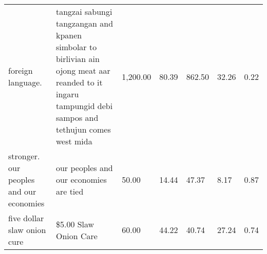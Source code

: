 \begin{table*}[ht!]
\begin{tabular}{p{5cm}p{5cm}p{1cm}p{1cm}p{1cm}p{1cm}p{1cm}}
foreign language.                                                                                                                                                                                                                                                                                  & tangzai sabungi tangzangan and kpanen simbolar to birlivian ain ojong meat aar reanded to it ingaru tampungid debi sampos and tethujun comes west mida                                                                                                                                               & 1,200.00 & 80.39 & 862.50 & 32.26 & 0.22       \\
stronger. our peoples and our economies                                                                                                                                                                                                                                                            & our peoples and our economies are tied                                                                                                                                                                                                                                                               & 50.00    & 14.44 & 47.37  & 8.17  & 0.87       \\
five dollar slaw onion cure                                                                                                                                                                                                                                                                        & \$5.00 Slaw Onion Care                                                                                                                                                                                                                                                                               & 60.00    & 44.22 & 40.74  & 27.24 & 0.74       \\

\end{tabular}
\end{table*}
